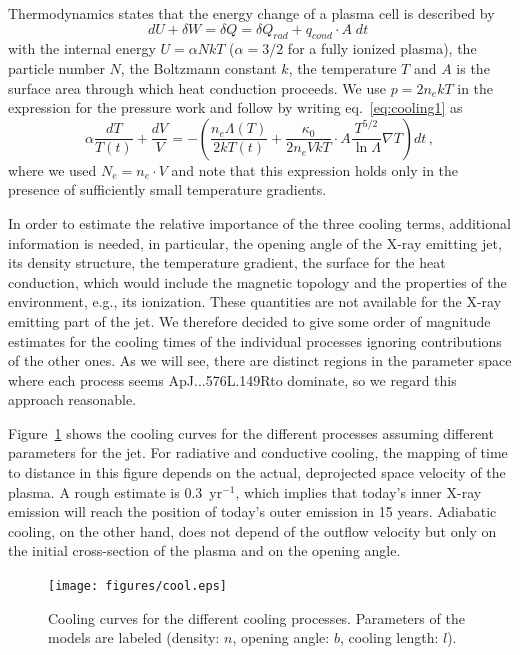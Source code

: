 Thermodynamics states that the energy change of a plasma cell is described by
\begin{equation}
dU + \delta W = \delta Q = \delta Q_{rad} + q_{cond}\cdot A\;dt\; \label{eq:cooling1}
\end{equation}
with the internal energy $U=\alpha N kT$ ($\alpha=3/2$ for a fully ionized plasma), the particle number $N$, the Boltzmann constant $k$, the temperature $T$  and $A$ is the surface area through which heat conduction proceeds.
We use $p=2n_ekT$ in the expression for the pressure work and follow \citet{Guedel_2008} by writing  eq.~\ref{eq:cooling1} as
\begin{equation}
\alpha \frac{dT}{T(t)} + \frac{dV}{V} = - \left( \frac{n_e \Lambda(T)}{2 k T(t)}+ \frac{\kappa_0}{2n_eVkT}\cdot A\frac{T^{5/2}}{\ln \Lambda} \nabla T \right) dt \,,\label{eq:cool}
\end{equation}
where we used $N_e=n_e\cdot V$ and note that this expression holds only in the presence of sufficiently small temperature gradients.


In order to estimate the relative importance of the three cooling terms, additional information is needed, in particular, the opening angle of the X-ray emitting jet, its density structure, the temperature gradient, the surface for the heat conduction, which would include the magnetic topology and the properties of the environment, e.g., its ionization. These quantities are not available for the X-ray emitting part of the jet. We therefore decided to give some order of magnitude estimates for the cooling times of the individual processes ignoring contributions of the other ones. As we will see, there are distinct regions in the parameter space where each process seems ApJ...576L.149Rto dominate, so we regard this approach reasonable.

Figure~\ref{fig:cooling} shows the cooling curves for the different processes assuming different parameters for the jet. For radiative and conductive cooling, the mapping of time to distance in this figure depends on the actual, deprojected space velocity of the plasma.
A rough estimate is 0.3\arcsec{}~yr$^{-1}$, which implies that today's inner X-ray emission will reach the position of today's outer emission in 15 years.
Adiabatic cooling, on the other hand, does not depend of the outflow velocity but only on the initial cross-section of the plasma and on the opening angle.


\begin{figure}
  \centering
   \texttt{[image: figures/cool.eps]}
   \caption{Cooling curves for the different cooling processes. Parameters of the models are labeled (density: $n$, opening angle: $b$, cooling length: $l$). \label{fig:cooling}}
\end{figure}



